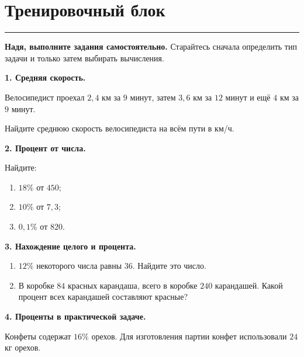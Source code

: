 \documentclass[a4paper,12pt]{article}
\newcommand{\sectionline}{%
    \vspace{0.2em}
    {\color{accent}\rule{\linewidth}{0.6pt}}
    \vspace{0.5em}
}
\begin{document}

\newpage

\section*{\color{darkaccent}Тренировочный блок}
\sectionline

\textbf{Надя, выполните задания самостоятельно.}
Старайтесь сначала определить тип задачи и только затем выбирать вычисления.

\medskip

\textbf{1. Средняя скорость.}

Велосипедист проехал \(2{,}4\) км за \(9\) минут,
затем \(3{,}6\) км за \(12\) минут и ещё \(4\) км за \(9\) минут.

Найдите среднюю скорость велосипедиста на всём пути в км/ч.

\vspace{8mm}

\textbf{2. Процент от числа.}

Найдите:

\begin{enumerate}[label=\alph*),leftmargin=10mm]
    \item \(18\%\) от \(450\);
    \item \(10\%\) от \(7{,}3\);
    \item \(0{,}1\%\) от \(820\).
\end{enumerate}

\vspace{8mm}

\textbf{3. Нахождение целого и процента.}

\begin{enumerate}[label=\alph*),leftmargin=10mm]
    \item \(12\%\) некоторого числа равны \(36\). Найдите это число.
    \item В коробке \(84\) красных карандаша, всего в коробке \(240\) карандашей.
    Какой процент всех карандашей составляют красные?
\end{enumerate}

\vspace{8mm}

\textbf{4. Проценты в практической задаче.}

Конфеты содержат \(16\%\) орехов.
Для изготовления партии конфет использовали \(24\) кг орехов.
\end{document}
